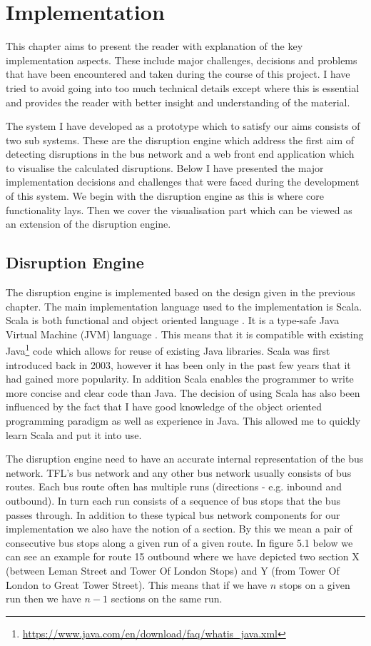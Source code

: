 \chapter{Implementation}
This chapter aims to present the reader with explanation of the key implementation aspects. These include major challenges, decisions and problems that have been encountered and taken during the course of this project. I have tried to avoid going into too much technical details except where this is essential and provides the reader with better insight and understanding of the material.

The system I have developed as a prototype which to satisfy our aims consists of two sub systems. These are the disruption engine which address the first aim of detecting disruptions in the bus network and a web front end application which to visualise the calculated disruptions. Below I have presented the major implementation decisions and challenges that were faced during the development of this system. We begin with the disruption engine as this is where core functionality lays. Then we cover the visualisation part which can be viewed as an extension of the disruption engine.

\section{Disruption Engine}
The disruption engine is implemented based on the design given in the previous chapter. The main implementation language used to the implementation is Scala. Scala is both functional and object oriented language \cite{odersky2008programming}. It is a type-safe Java Virtual Machine (JVM) language  \cite{odersky2008programming}. This means that it is compatible with existing Java\footnote{\url{https://www.java.com/en/download/faq/whatis_java.xml}} code which allows for reuse of existing Java libraries. Scala was first introduced back in 2003, however it has been only in the past few years that it had gained more popularity. In addition Scala enables the programmer to write more concise and clear code than Java. The decision of using Scala has also been influenced by the fact that I have good knowledge of the object oriented programming paradigm as well as experience in Java. This allowed me to quickly learn Scala and put it into use.

The disruption engine need to have an accurate internal representation of the bus network. TFL's bus network and any other bus network usually consists of bus routes. Each bus route often has multiple runs (directions - e.g. inbound and outbound). In turn each run consists of a sequence of bus stops that the bus passes through. In addition to these typical bus network components for our implementation we also have the notion of a section. By this we mean a pair of consecutive bus stops along a given run of a given route. In figure 5.1 below we can see an example for route 15 outbound where we have depicted two section X (between Leman Street and Tower Of London Stops) and Y (from Tower Of London to Great Tower Street). This means that if we have $n$ stops on a given run then we have $n-1$ sections on the same run.


